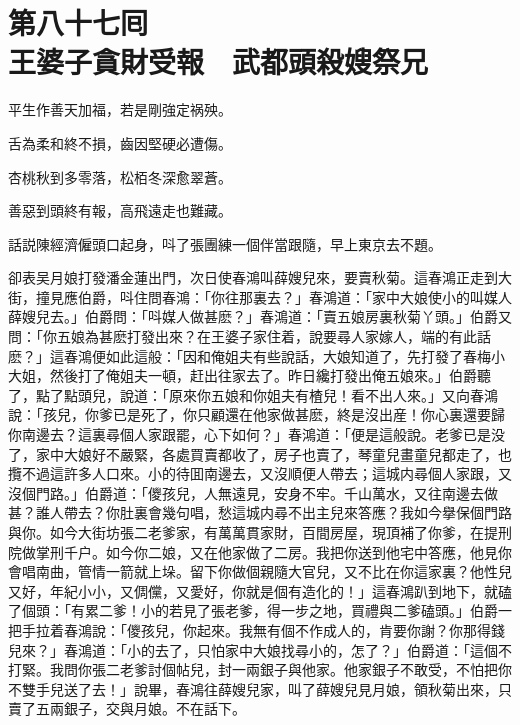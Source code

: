 
\chapter*{第八十七囘　\\王婆子貪財受報　武都頭殺嫂祭兄}


\begin{myquote}
平生作善天加福，若是剛強定祸殃。

舌為柔和終不損，齒因堅硬必遭傷。

杏桃秋到多零落，松栢冬深愈翠蒼。

善惡到頭終有報，高飛遠走也難藏。
\end{myquote}

話説陳經濟僱頭口起身，呌了張團練一個伴當跟隨，早上東京去不題。

卻表吴月娘打發潘金蓮出門，次日使春鴻叫薛嫂兒來，要賣秋菊。這春鴻正走到大街，撞見應伯爵，呌住問春鴻：「你往那裏去？」春鴻道：「家中大娘使小的叫媒人薛嫂兒去。」伯爵問：「呌媒人做甚麽？」春鴻道：「賣五娘房裏秋菊丫頭。」伯爵又問：「你五娘為甚麽打發出來？在王婆子家住着，說要尋人家嫁人，端的有此話麽？」這春鴻便如此這般：「因和俺姐夫有些說話，大娘知道了，先打發了春梅小大姐，然後打了俺姐夫一頓，赶出往家去了。昨日纔打發出俺五娘來。」伯爵聽了，點了點頭兒，說道：「原來你五娘和你姐夫有楂兒！看不出人來。」又向春鴻說：「孩兒，你爹已是死了，你只顧還在他家做甚麽，終是沒出産！你心裏還要歸你南邊去？這裏尋個人家跟罷，心下如何？」春鴻道：「便是這般說。老爹已是没了，家中大娘好不嚴緊，各處買賣都收了，房子也賣了，琴童兒畫童兒都走了，也攬不過這許多人口來。小的待囬南邊去，又沒順便人帶去；這城内尋個人家跟，又沒個門路。」伯爵道：「儍孩兒，人無遠見，安身不牢。千山萬水，又往南邊去做甚？誰人帶去？你肚裏會幾句唱，愁這城内尋不出主兒來答應？我如今擧保個門路與你。如今大街坊張二老爹家，有萬萬貫家財，百間房屋，現頂補了你爹，在提刑院做掌刑千户。如今你二娘，又在他家做了二房。我把你送到他宅中答應，他見你會唱南曲，管情一箭就上垛。留下你做個親隨大官兒，又不比在你這家裏？他性兒又好，年紀小小，又倜儻，又愛好，你就是個有造化的！」這春鴻趴到地下，就磕了個頭：「有累二爹！小的若見了張老爹，得一步之地，買禮與二爹磕頭。」伯爵一把手拉着春鴻說：「儍孩兒，你起來。我無有個不作成人的，肯要你謝？你那得錢兒來？」春鴻道：「小的去了，只怕家中大娘找尋小的，怎了？」伯爵道：「這個不打緊。我問你張二老爹討個帖兒，封一兩銀子與他家。他家銀子不敢受，不怕把你不雙手兒送了去！」說畢，春鴻往薛嫂兒家，叫了薛嫂兒見月娘，領秋菊出來，只賣了五兩銀子，交與月娘。不在話下。

